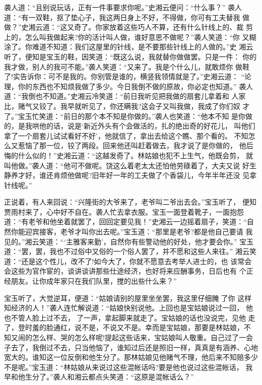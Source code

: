 袭人道：“且别说玩话，正有一件事要求你呢。”史湘云便问：“什么事？”
袭人道：“有一双鞋，抠了垫心子，我这两日身上不好，不得做，你可有工夫替我
做做？”史湘云道：“这又奇了。你家放着这些巧人不算，还有什么针线上的、裁
剪上的，怎么叫我做起来?你的活计叫人做，谁好意思不做呢？”袭人笑道：“你
又糊涂了。你难道不知道：我们这屋里的针线，是不要那些针线上的人做的。”史
湘云听了，便知是宝玉的鞋，因笑道：“既这么说，我就替你做做罢。只是一件：
你的我才做，别人的我可不能。”袭人笑道：“又来了。我是个什么儿，就敢烦你
做鞋了!实告诉你：可不是我的。你别管是谁的，横竖我领情就是了。”史湘云道：
“论理，你的东西也不知烦我做了多少。今日我倒不做的原故，你必定也知道。”
袭人道：“我倒也不知道。”史湘云冷笑道：“前日我听见把我做的扇套儿拿着和
人家比，赌气又铰了。我早就听见了，你还瞒我?这会子又叫我做，我成了你们奴
才了。”宝玉忙笑道：“前日的那个本不知是你做的。”袭人也笑道：“他本不知
是你做的，是我哄他的话，说是‘新近外头有个会做活的，扎的绝出奇的好花儿，
叫他们拿了一个扇套儿试试看好不好’，他就信了，拿出去给这个瞧、那个看的。
不知怎么又惹恼了那一位，铰了两段。回来他还叫赶着做去，我才说了是你做的，
他后悔的什么似的！”史湘云道：“这越发奇了。林姑娘也犯不上生气，他既会剪，
就叫他做。”袭人道：“他可不做呢。饶这么着老太太还怕他劳碌着了，大夫又说
好生静养才好，谁还肯烦他做呢?旧年好一年的工夫做了个香袋儿，今年半年还没
见拿针线呢。”

正说着，有人来回说：“兴隆街的大爷来了，老爷叫二爷出去会。”宝玉听了，
便知贾雨村来了，心中好不自在。袭人忙去拿衣服。宝玉一面登着靴子，一面抱怨
道：“有老爷和他坐着就罢了，回回定要见我！”史湘云一边摇着扇子，笑道：“自
然你能迎宾接客，老爷才叫你出去呢。”宝玉道：“那里是老爷?都是他自己要请
我见的。”湘云笑道：“‘主雅客来勤’，自然你有些警动他的好处，他才要会你。”
宝玉道：“罢，罢，我也不过俗中又俗的一个俗人罢了，并不愿和这些人来往。”
湘云笑道：“还是这个性儿，改不了!如今大了，你就不愿意去考举人进士的，也
该常会会这些为官作宦的，谈讲谈讲那些仕途经济，也好将来应酬事务，日后也有
个正经朋友。让你成年家只在我们队里，搅的出些什么来？”

宝玉听了，大觉逆耳，便道：“姑娘请别的屋里坐坐罢，我这里仔细腌了你
这样知经济的人！”袭人连忙解说道：“姑娘快别说他。上回也是宝姑娘说过一回，
他也不管人脸上过不去，了一声，拿起脚来就走了。宝姑娘的话也没说完，见他
走了，登时羞的脸通红，说不是，不说又不是。幸而是宝姑娘，那要是林姑娘，不
知又闹的怎么样、哭的怎么样呢!提起这些话来，宝姑娘叫人敬重。自己过了一会
子去了，我倒过不去，只当他恼了，谁知过后还是照旧一样，真真是有涵养、心地
宽大的。谁知这一位反倒和他生分了。那林姑娘见他赌气不理，他后来不知赔多少
不是呢。”宝玉道：“林姑娘从来说过这些混帐话吗?要是他也说过这些混帐话，
我早和他生分了。”袭人和湘云都点头笑道：“这原是混帐话么？”

